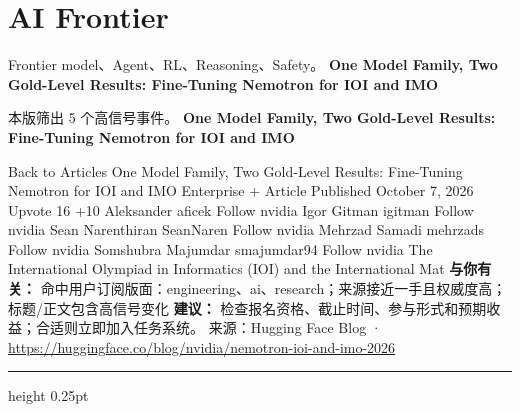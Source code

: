 \documentclass[10.5pt]{ctexart}
\begin{document}
\section*{AI Frontier}
{\color{ormuted} Frontier model、Agent、RL、Reasoning、Safety。}
\vspace{2mm}
{\LARGE\bfseries One Model Family, Two Gold-Level Results: Fine-Tuning Nemotron for IOI and IMO}\par
\vspace{1mm}
{\color{ormuted} 本版筛出 5 个高信号事件。}
\vspace{3mm}
{\Large\bfseries One Model Family, Two Gold-Level Results: Fine-Tuning Nemotron for IOI and IMO}\par
Back to Articles One Model Family, Two Gold-Level Results: Fine-Tuning Nemotron for IOI and IMO Enterprise + Article Published October 7, 2026 Upvote 16 +10 Aleksander aficek Follow nvidia Igor Gitman igitman Follow nvidia Sean Narenthiran SeanNaren Follow nvidia Mehrzad Samadi mehrzads Follow nvidia Somshubra Majumdar smajumdar94 Follow nvidia The International Olympiad in Informatics (IOI) and the International Mat
\textbf{与你有关：} 命中用户订阅版面：engineering、ai、research；来源接近一手且权威度高；标题/正文包含高信号变化
\textbf{建议：} 检查报名资格、截止时间、参与形式和预期收益；合适则立即加入任务系统。
{\footnotesize\color{ormuted} 来源：Hugging Face Blog · \url{https://huggingface.co/blog/nvidia/nemotron-ioi-and-imo-2026}}
\vspace{4mm}
\hrule height 0.25pt
\vspace{3mm}
\end{document}
